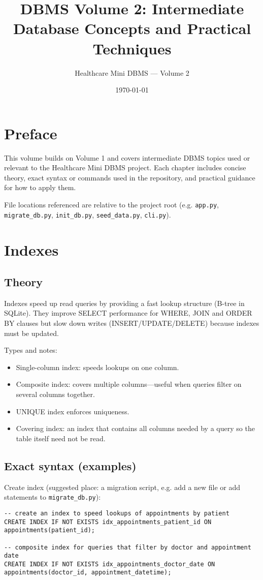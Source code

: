 \documentclass[11pt,a4paper]{article}
\title{DBMS Volume 2: Intermediate Database Concepts and Practical Techniques}
\author{Healthcare Mini DBMS — Volume 2}
\date{\today}
\begin{document}
\maketitle
\tableofcontents
\newpage

\section*{Preface}
This volume builds on Volume 1 and covers intermediate DBMS topics used or relevant to the Healthcare Mini DBMS project. Each chapter includes concise theory, exact syntax or commands used in the repository, and practical guidance for how to apply them.

File locations referenced are relative to the project root (e.g. \texttt{app.py}, \texttt{migrate_db.py}, \texttt{init_db.py}, \texttt{seed_data.py}, \texttt{cli.py}).

\section{Indexes}
\subsection{Theory}
Indexes speed up read queries by providing a fast lookup structure (B-tree in SQLite). They improve SELECT performance for WHERE, JOIN and ORDER BY clauses but slow down writes (INSERT/UPDATE/DELETE) because indexes must be updated.

Types and notes:
\begin{itemize}
  \item Single-column index: speeds lookups on one column.
  \item Composite index: covers multiple columns—useful when queries filter on several columns together.
  \item UNIQUE index enforces uniqueness.
  \item Covering index: an index that contains all columns needed by a query so the table itself need not be read.
\end{itemize}

\subsection{Exact syntax (examples)}
Create index (suggested place: a migration script, e.g. add a new file or add statements to \texttt{migrate_db.py}):
\begin{lstlisting}
-- create an index to speed lookups of appointments by patient
CREATE INDEX IF NOT EXISTS idx_appointments_patient_id ON appointments(patient_id);

-- composite index for queries that filter by doctor and appointment date
CREATE INDEX IF NOT EXISTS idx_appointments_doctor_date ON appointments(doctor_id, appointment_datetime);
\end{lstlisting}
\end{document}
